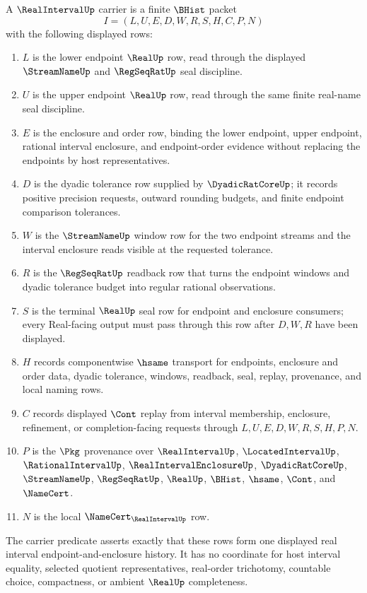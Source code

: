 \begin{definition}
\label{def:real-interval-carrier}
A $\RealIntervalUp$ carrier is a finite $\BHist$ packet
$$
I=(L,U,E,D,W,R,S,H,C,P,N)
$$
with the following displayed rows:
\begin{enumerate}
\item $L$ is the lower endpoint $\RealUp$ row, read through the displayed $\StreamNameUp$ and $\RegSeqRatUp$ seal discipline.
\item $U$ is the upper endpoint $\RealUp$ row, read through the same finite real-name seal discipline.
\item $E$ is the enclosure and order row, binding the lower endpoint, upper endpoint, rational interval enclosure, and endpoint-order evidence without replacing the endpoints by host representatives.
\item $D$ is the dyadic tolerance row supplied by $\DyadicRatCoreUp$; it records positive precision requests, outward rounding budgets, and finite endpoint comparison tolerances.
\item $W$ is the $\StreamNameUp$ window row for the two endpoint streams and the interval enclosure reads visible at the requested tolerance.
\item $R$ is the $\RegSeqRatUp$ readback row that turns the endpoint windows and dyadic tolerance budget into regular rational observations.
\item $S$ is the terminal $\RealUp$ seal row for endpoint and enclosure consumers; every Real-facing output must pass through this row after $D,W,R$ have been displayed.
\item $H$ records componentwise $\hsame$ transport for endpoints, enclosure and order data, dyadic tolerance, windows, readback, seal, replay, provenance, and local naming rows.
\item $C$ records displayed $\Cont$ replay from interval membership, enclosure, refinement, or completion-facing requests through $L,U,E,D,W,R,S,H,P,N$.
\item $P$ is the $\Pkg$ provenance over $\RealIntervalUp$, $\LocatedIntervalUp$, $\RationalIntervalUp$, $\RealIntervalEnclosureUp$, $\DyadicRatCoreUp$, $\StreamNameUp$, $\RegSeqRatUp$, $\RealUp$, $\BHist$, $\hsame$, $\Cont$, and $\NameCert$.
\item $N$ is the local $\NameCert_{\RealIntervalUp}$ row.
\end{enumerate}
The carrier predicate asserts exactly that these rows form one displayed real interval endpoint-and-enclosure history. It has no coordinate for host interval equality, selected quotient representatives, real-order trichotomy, countable choice, compactness, or ambient $\RealUp$ completeness.
\end{definition}

